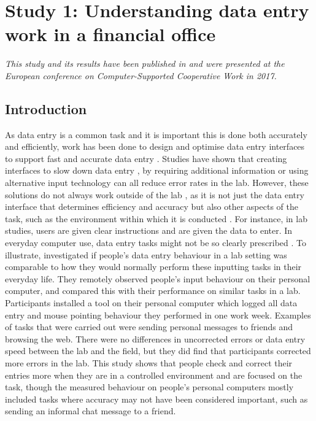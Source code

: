 \section{Study 1: Understanding data entry work in a financial office}\label{ch:Study1}
 
\textit{This study and its results have been published in \citet{Borghouts2017} and were presented at the European conference on Computer-Supported Cooperative Work in 2017.}
 
\subsection{Introduction}
As data entry is a common task and it is important this is done both accurately and efficiently, work has been done to design and optimise data entry interfaces to support fast and accurate data entry \citep[e.g.][]{Oladimeji2013, Vertanen2015, Wiseman2013a}. Studies have shown that creating interfaces to slow down data entry \citep{Gould 2016b}, by requiring additional information \citep{Wiseman2013a} or using alternative input technology \citep{Oladimeji2011} can all reduce error rates in the lab. However, these solutions do not always work outside of the lab \citep[e.g.][]{Gould 2016b}, as it is not just the data entry interface that determines efficiency and accuracy but also other aspects of the task, such as the environment within which it is conducted \citep{Payne2013, Randall2014}. For instance, in lab studies, users are given clear instructions and are given the data to enter. In everyday computer use, data entry tasks might not be so clearly prescribed \citep{Evans2012}. To illustrate, \citet{Evans2012} investigated if people's data entry behaviour in a lab setting was comparable to how they would normally perform these inputting tasks in their everyday life. They remotely observed people's input behaviour on their personal computer, and compared this with their performance on similar tasks in a lab. Participants installed a tool on their personal computer which logged all data entry and mouse pointing behaviour they performed in one work week. Examples of tasks that were carried out were sending personal messages to friends and browsing the web. There were no differences in uncorrected errors or data entry speed between the lab and the field, but they did find that participants corrected more errors in the lab. This study shows that people check and correct their entries more when they are in a controlled environment and are focused on the task, though the measured behaviour on people's personal computers mostly included tasks where accuracy may not have been considered important, such as sending an informal chat message to a friend. 


